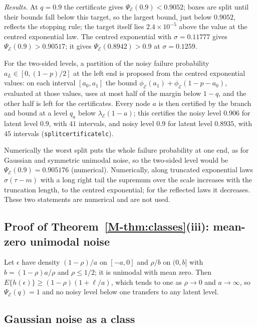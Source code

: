 \documentclass[11pt]{article}
\renewcommand{\_}{\usc\allowbreak}
\begin{document}
\emph{Results.} At $q = 0.9$ the certificate gives $\Psi_{\mathcal E}(0.9) < 0.9052$; boxes are split until their bounds fall below this target, so the largest bound, just below $0.9052$, reflects the stopping rule; the target itself lies $2.4\times10^{-5}$ above the value at the centred exponential law. The centred exponential with $\sigma = 0.11777$ gives $\Psi_{\mathcal E}(0.9) > 0.90517$; it gives $\Psi_{\mathcal E}(0.8942) > 0.9$ at $\sigma = 0.1259$.

For the two-sided levels, a partition of the noisy failure probability $a_L \in [0, (1 - p)/2]$ at the left end is proposed from the centred exponential values: on each interval $[a_0, a_1]$ the bound $\phi_{\mathcal E}(a_1) + \phi_{\mathcal E}(1 - p - a_0)$, evaluated at those values, uses at most half of the margin below $1 - q$, and the other half is left for the certificates. Every node $a$ is then certified by the branch and bound at a level $q_a$ below $\lambda_{\mathcal E}(1 - a)$; this certifies the noisy level $0.906$ for latent level $0.9$, with $41$ intervals, and noisy level $0.9$ for latent level $0.8935$, with $45$ intervals (\texttt{split\_certificate\_lc}).

Numerically the worst split puts the whole failure probability at one end, as for Gaussian and symmetric unimodal noise, so the two-sided level would be $\Psi_{\mathcal E}(0.9) = 0.905176$ (numerical). Numerically, along truncated exponential laws $\sigma(\tau - m)$ with a long right tail the supremum over the scale increases with the truncation length, to the centred exponential; for the reflected laws it decreases. These two statements are numerical and are not used.

\subsection*{Proof of Theorem~\ref{M-thm:classes}(iii): mean-zero unimodal noise}

Let $\epsilon$ have density $(1 - \rho)/a$ on $[-a, 0]$ and $\rho/b$ on $(0, b]$ with $b = (1 - \rho)a/\rho$ and $\rho \le 1/2$; it is unimodal with mean zero. Then $E\{h(\epsilon)\} \ge (1 - \rho)(1 + \ell/a)$, which tends to one as $\rho \to 0$ and $a \to \infty$, so $\Psi_{\mathcal E}(q) = 1$ and no noisy level below one transfers to any latent level.

\subsection*{Gaussian noise as a class}
\end{document}
